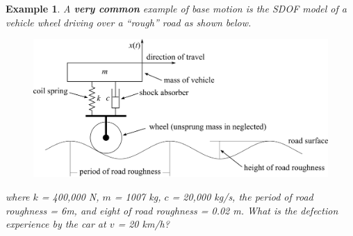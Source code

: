 \documentclass[12pt,letter]{article}
\newtheorem{ex}{Example}
\numberwithin{ex}{section} %
\newenvironment{example}{\begin{mdframed}[middlelinewidth=0.5mm]\begin{ex}\normalfont}{\end{ex}\end{mdframed}}
\numberwithin{re}{section} %
\begin{document}
\begin{example}

			A \textbf{very common} example of base motion is the SDOF model of a vehicle wheel driving over a ``rough'' road as shown below. 
			\begin{figure}[H]
				\centering
				\includegraphics[]{../Figures/Vehicle_on_road_example.png}
			\end{figure}				
			where $k$ = 400,000 N, $m$ = 1007 kg, $c$ = 20,000 kg/s, the period of road roughness = 6m, and eight of road roughness = 0.02 m. What is the defection experience by the car at $v$ = 20 km/h?
			

\end{example}
\end{document}
